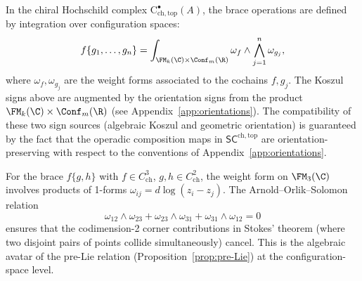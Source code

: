 In the chiral Hochschild complex $\mathrm{C}^\bullet_{\mathrm{ch,top}}(A)$, the brace operations are defined by integration over configuration spaces:
\[
f\{g_1, \ldots, g_n\} = \int_{\FM_k(\C) \times \Conf_m(\R)} \omega_f \wedge \bigwedge_{j=1}^n \omega_{g_j},
\]
where $\omega_f, \omega_{g_j}$ are the weight forms associated to the cochains $f, g_j$. The Koszul signs above are augmented by the orientation signs from the product $\FM_k(\C) \times \Conf_m(\R)$ (see Appendix~\ref{app:orientations}). The compatibility of these two sign sources (algebraic Koszul and geometric orientation) is guaranteed by the fact that the operadic composition maps in $\mathsf{SC}^{\mathrm{ch,top}}$ are orientation-preserving with respect to the conventions of Appendix~\ref{app:orientations}.

\begin{example}
\label{ex:arnold-brace}
For the brace $f\{g, h\}$ with $f \in C^3_{\mathrm{ch}}$, $g, h \in C^2_{\mathrm{ch}}$, the weight form on $\FM_3(\C)$ involves products of 1-forms $\omega_{ij} = d\log(z_i - z_j)$. The Arnold--Orlik--Solomon relation
\[
\omega_{12} \wedge \omega_{23} + \omega_{23} \wedge \omega_{31} + \omega_{31} \wedge \omega_{12} = 0
\]
ensures that the codimension-2 corner contributions in Stokes' theorem (where two disjoint pairs of points collide simultaneously) cancel. This is the algebraic avatar of the pre-Lie relation (Proposition~\ref{prop:pre-Lie}) at the configuration-space level.
\end{example}
